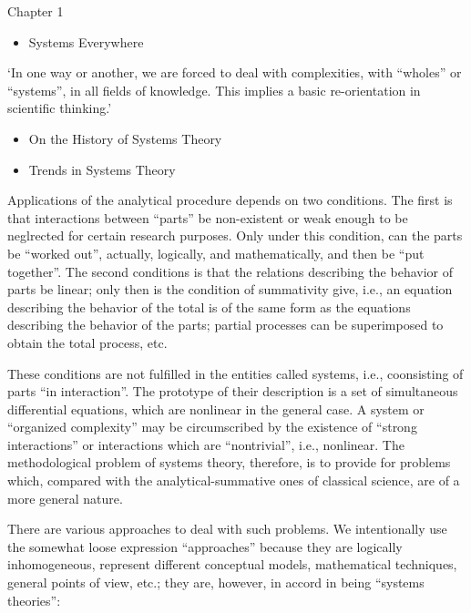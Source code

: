 \documentclass[
]{book}
\providecommand{\tightlist}{%
  \setlength{\itemsep}{0pt}\setlength{\parskip}{0pt}}
\begin{document}
Chapter 1

\begin{itemize}
\tightlist
\item
  Systems Everywhere
\end{itemize}

`In one way or another, we are forced to deal with complexities, with ``wholes'' or ``systems'', in all fields of knowledge. This implies a basic re-orientation in scientific thinking.'

\begin{itemize}
\item
  On the History of Systems Theory
\item
  Trends in Systems Theory
\end{itemize}

Applications of the analytical procedure depends on two conditions. The first is that interactions between ``parts'' be non-existent or weak enough to be neglrected for certain research purposes. Only under this condition, can the parts be ``worked out'', actually, logically, and mathematically, and then be ``put together''. The second conditions is that the relations describing the behavior of parts be linear; only then is the condition of summativity give, i.e., an equation describing the behavior of the total is of the same form as the equations describing the behavior of the parts; partial processes can be superimposed to obtain the total process, etc.

These conditions are not fulfilled in the entities called systems, i.e., coonsisting of parts ``in interaction''. The prototype of their description is a set of simultaneous differential equations, which are nonlinear in the general case. A system or ``organized complexity'' may be circumscribed by the existence of ``strong interactions'' or interactions which are ``nontrivial'', i.e., nonlinear. The methodological problem of systems theory, therefore, is to provide for problems which, compared with the analytical-summative ones of classical science, are of a more general nature.

There are various approaches to deal with such problems. We intentionally use the somewhat loose expression ``approaches'' because they are logically inhomogeneous, represent different conceptual models, mathematical techniques, general points of view, etc.; they are, however, in accord in being ``systems theories'':
\end{document}
